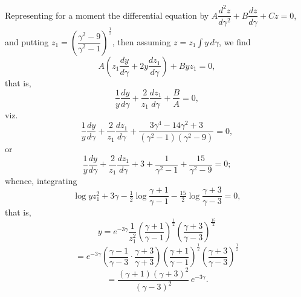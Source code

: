 \documentclass[11pt]{article}
\begin{document}
\medskip
Representing for a moment the differential equation by $A\dfrac{d^{2}z}{d\gamma^{2}}+B\dfrac{dz}{d\gamma}+Cz=0$, and
putting $z_{1}=\!\left(\dfrac{\gamma^{2}-9}{\gamma^{2}-1}\right)^{\frac{1}{2}}$, then assuming $z=z_{1}\!\int y\,d\gamma$,
we find
\[
A\!\left(z_{1}\frac{dy}{d\gamma}+2y\frac{dz_{1}}{d\gamma}\right)+By z_{1}=0,
\]
that is,
\[
\frac{1}{y}\frac{dy}{d\gamma}+\frac{2}{z_{1}}\frac{dz_{1}}{d\gamma}+\frac{B}{A}=0,
\]
viz.
\[
\frac{1}{y}\frac{dy}{d\gamma}+\frac{2}{z_{1}}\frac{dz_{1}}{d\gamma}+\frac{3\gamma^{4}-14\gamma^{2}+3}{(\gamma^{2}-1)(\gamma^{2}-9)}=0,
\]
or
\[
\frac{1}{y}\frac{dy}{d\gamma}+\frac{2}{z_{1}}\frac{dz_{1}}{d\gamma}+3+\frac{1}{\gamma^{2}-1}+\frac{15}{\gamma^{2}-9}=0;
\]
whence, integrating
\[
\log y z_{1}^{2}+3\gamma-\tfrac{1}{2}\log\frac{\gamma+1}{\gamma-1}-\tfrac{15}{2}\log\frac{\gamma+3}{\gamma-3}=0,
\]
that is,
\[
y=e^{-3\gamma}\frac{1}{z_{1}^{2}}\!\left(\frac{\gamma+1}{\gamma-1}\right)^{\frac{1}{2}}\!\left(\frac{\gamma+3}{\gamma-3}\right)^{\frac{15}{2}}
\]
\[
=e^{-3\gamma}\!\left(\frac{\gamma-1}{\gamma-3}\cdot\frac{\gamma+3}{\gamma+3}\right)\!\left(\frac{\gamma+1}{\gamma-1}\right)^{\frac{1}{2}}\!\left(\frac{\gamma+3}{\gamma-3}\right)^{\frac{1}{2}}
\]
\[
=\frac{(\gamma+1)(\gamma+3)^{2}}{(\gamma-3)^{2}}\,e^{-3\gamma}.
\]
\end{document}
